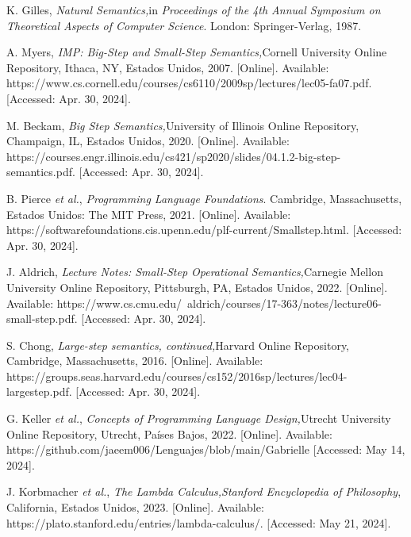 \begin{thebibliography}{11}
    \label{sec:101}
    \hypertarget{101}{}
    K. Gilles, \textit{Natural Semantics,}in \textit{Proceedings of the 4th Annual Symposium on Theoretical Aspects of Computer Science}. London: Springer-Verlag, 1987.

    \label{sec:102}
    \hypertarget{102}{}
    A. Myers, \textit{IMP: Big-Step and Small-Step Semantics,}Cornell University Online Repository, Ithaca, NY, Estados Unidos, 2007. [Online]. Available: https://www.cs.cornell.edu/courses/cs6110/2009sp/lectures/lec05-fa07.pdf. [Accessed: Apr. 30, 2024].

    \label{sec:103}
    \hypertarget{103}{}
    M. Beckam, \textit{Big Step Semantics,}University of Illinois Online Repository, Champaign, IL, Estados Unidos, 2020. [Online]. Available: https://courses.engr.illinois.edu/cs421/sp2020/slides/04.1.2-big-step-semantics.pdf. [Accessed: Apr. 30, 2024].

    \label{sec:104}
    \hypertarget{104}{}
    B. Pierce \textit{et al.}, \textit{Programming Language Foundations}. Cambridge, Massachusetts, Estados Unidos: The MIT Press, 2021. [Online]. Available: https://softwarefoundations.cis.upenn.edu/plf-current/Smallstep.html. [Accessed: Apr. 30, 2024].

    \label{sec:105}
    \hypertarget{105}{}
    J. Aldrich, \textit{Lecture Notes: Small-Step Operational Semantics,}Carnegie Mellon University Online Repository, Pittsburgh, PA, Estados Unidos, 2022. [Online]. Available: https://www.cs.cmu.edu/~aldrich/courses/17-363/notes/lecture06-small-step.pdf. [Accessed: Apr. 30, 2024].

    \label{sec:106}
    \hypertarget{106}{}
    S. Chong, \textit{Large-step semantics, continued,}Harvard Online Repository, Cambridge, Massachusetts, 2016. [Online]. Available: https://groups.seas.harvard.edu/courses/cs152/2016sp/lectures/lec04-largestep.pdf. [Accessed: Apr. 30, 2024].

    \label{sec:107}
    \hypertarget{107}{}
    G. Keller \textit{et al.}, \textit{Concepts of Programming Language Design,}Utrecht University Online Repository, Utrecht, Países Bajos, 2022. [Online]. Available: https://github.com/jaeem006/Lenguajes/blob/main/Gabrielle [Accessed: May 14, 2024].

    \label{sec:108}
    \hypertarget{108}{}
    J. Korbmacher \textit{et al.}, \textit{The Lambda Calculus,}\textit{Stanford Encyclopedia of Philosophy}, California, Estados Unidos, 2023. [Online]. Available: https://plato.stanford.edu/entries/lambda-calculus/. [Accessed: May 21, 2024].


\end{thebibliography}
